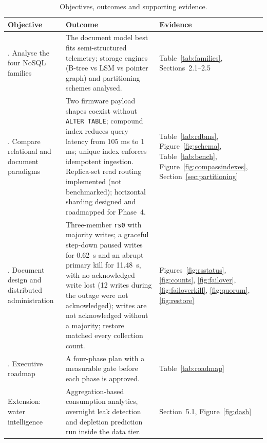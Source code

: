 \documentclass[11pt,a4paper]{article}
\begin{document}
\begin{table}[htbp]
\centering\small
\caption{Objectives, outcomes and supporting evidence.}\label{tab:objectives}
\renewcommand{\arraystretch}{1.3}
\begin{tabularx}{\textwidth}{|>{\raggedright\arraybackslash}p{3.1cm}|Y|>{\raggedright\arraybackslash}p{3.4cm}|}
\hline
\textbf{Objective} & \textbf{Outcome} & \textbf{Evidence}\\
. Analyse the four NoSQL families & The document model best fits semi-structured telemetry; storage engines (B-tree vs LSM vs pointer graph) and partitioning schemes analysed. & Table~\ref{tab:families}, Sections~2.1--2.5\\
. Compare relational and document paradigms & Two firmware payload shapes coexist without \texttt{ALTER TABLE}; compound index reduces query latency from 105 ms to 1 ms; unique index enforces idempotent ingestion. Replica-set read routing implemented (not benchmarked); horizontal sharding designed and roadmapped for Phase~4. & Table~\ref{tab:rdbms}, Figure~\ref{fig:schema}, Table~\ref{tab:bench}, Figure~\ref{fig:compassindexes}, Section~\ref{sec:partitioning}\\
. Document design and distributed administration & Three-member \texttt{rs0} with majority writes; a graceful step-down paused writes for 0.62~s and an abrupt primary kill for 11.48~s, with no acknowledged write lost (12 writes during the outage were not acknowledged); writes are not acknowledged without a majority; restore matched every collection count. & Figures~\ref{fig:rsstatus}, \ref{fig:counts}, \ref{fig:failover}, \ref{fig:failoverkill}, \ref{fig:quorum}, \ref{fig:restore}\\
. Executive roadmap & A four-phase plan with a measurable gate before each phase is approved. & Table~\ref{tab:roadmap}\\
\hline
Extension: water intelligence & Aggregation-based consumption analytics, overnight leak detection and depletion prediction run inside the data tier. & Section~5.1, Figure~\ref{fig:dash}\\
\hline
\end{tabularx}
\end{table}
\end{document}
